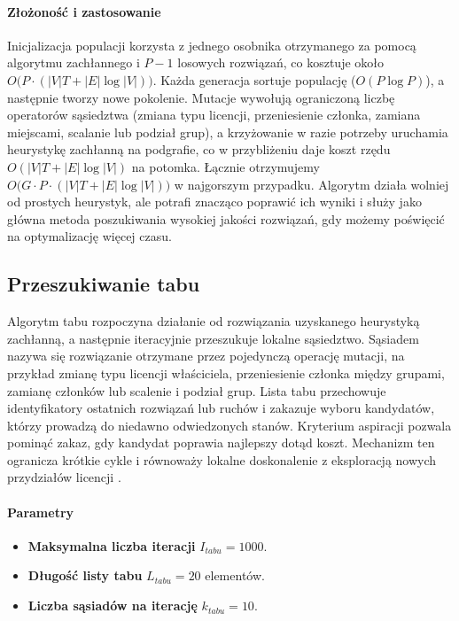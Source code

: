 \paragraph{Złożoność i zastosowanie}
Inicjalizacja populacji korzysta z jednego osobnika otrzymanego za pomocą algorytmu zachłannego i $P-1$ losowych rozwiązań, co kosztuje około $O\bigl(P \cdot (|V|T + |E|\log |V|)\bigr)$. Każda generacja sortuje populację ($O(P\log P)$), a następnie tworzy nowe pokolenie. Mutacje wywołują ograniczoną liczbę operatorów sąsiedztwa (zmiana typu licencji, przeniesienie członka, zamiana miejscami, scalanie lub podział grup), a krzyżowanie w razie potrzeby uruchamia heurystykę zachłanną na podgrafie, co w przybliżeniu daje koszt rzędu $O(|V|T + |E|\log |V|)$ na potomka. Łącznie otrzymujemy $O\bigl(G \cdot P \cdot (|V|T + |E|\log |V|)\bigr)$ w najgorszym przypadku. Algorytm działa wolniej od prostych heurystyk, ale potrafi znacząco poprawić ich wyniki i służy jako główna metoda poszukiwania wysokiej jakości rozwiązań, gdy możemy poświęcić na optymalizację więcej czasu.


\subsection{Przeszukiwanie tabu}\label{subsec:tabu}
Algorytm tabu rozpoczyna działanie od rozwiązania uzyskanego heurystyką zachłanną, a następnie iteracyjnie przeszukuje lokalne sąsiedztwo. Sąsiadem nazywa się rozwiązanie otrzymane przez pojedynczą operację mutacji, na przykład zmianę typu licencji właściciela, przeniesienie członka między grupami, zamianę członków lub scalenie i podział grup. Lista tabu przechowuje identyfikatory ostatnich rozwiązań lub ruchów i zakazuje wyboru kandydatów, którzy prowadzą do niedawno odwiedzonych stanów. Kryterium aspiracji pozwala pominąć zakaz, gdy kandydat poprawia najlepszy dotąd koszt. Mechanizm ten ogranicza krótkie cykle i równoważy lokalne doskonalenie z eksploracją nowych przydziałów licencji \cite{glover1989}.

\paragraph{Parametry}
\begin{itemize}
  \item \textbf{Maksymalna liczba iteracji} $I_{tabu}=1000$.
  \item \textbf{Długość listy tabu} $L_{tabu}=20$ elementów.
  \item \textbf{Liczba sąsiadów na iterację} $k_{tabu}=10$.
\end{itemize}

